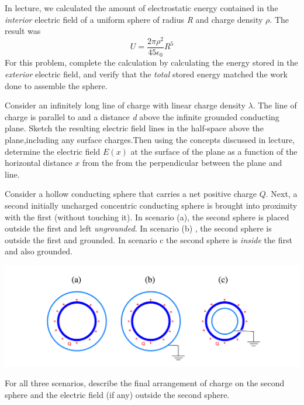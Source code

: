 \documentclass[11pt,letterpaper,boxed]{hmcpset}
\begin{document}
\begin{solution}
\vfill
\end{solution}
\newpage

\begin{problem}
In lecture, we calculated the amount of electrostatic energy contained in the \textit{interior} electric field of a uniform sphere of radius \textit{R }and charge density $\rho$. The result was 
$$ U =\frac{2\pi \rho^2}{45 \epsilon_0}R^5$$
For this problem, complete the calculation by calculating the energy stored in the \textit{exterior} electric field, and verify that the \textit{total} stored energy matched the work done to assemble the sphere. 
\end{problem}

\begin{solution}
\vfill
\end{solution}
\newpage

\begin{problem}[4.]
Consider an infinitely long line of charge with linear charge density $\lambda$. The line of charge is parallel to and a distance \textit{d} above the  infinite grounded conducting plane.  Sketch the resulting electric field lines in the half-space above the plane,including   any surface charges.Then using the concepts discussed in lecture, determine the electric field $E(x)$ at the surface of the plane as a function of the horizontal distance $x$ from the from the perpendicular between the plane and line.  
\end{problem}

\begin{solution}
\vfill
\end{solution}
\newpage

\begin{problem}[5.]
Consider a hollow conducting sphere that carries a net positive charge $Q$. Next, a second initially uncharged concentric conducting sphere is brought into proximity with the first (without touching  it). In scenario (a), the second sphere is placed outside the first and left \textit{ungrounded}. In scenario (b) , the second sphere is outside the first and grounded. In scenario c the second sphere is \textit{inside} the first and also grounded. 
\begin{center}
\includegraphics[scale=0.6]{5.png}
\end{center}
For all three scenarios, describe the final arrangement of charge on the second sphere and the electric field (if any) outside the second sphere. 
\end{problem}
\end{document}
